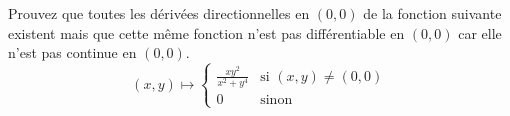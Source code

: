 
\begin{exercice}\label{exo0046}

Prouvez que toutes les dérivées directionnelles en $(0,0)$ de la fonction suivante existent mais que cette même fonction n'est pas différentiable en $(0,0)$ car elle n'est pas continue en $(0,0)$.
\begin{equation}
	(x,y)\mapsto\begin{cases}
	\frac{ xy^2 }{ x^2+y^4 }	&	\text{si }(x,y)\neq(0,0)\\
	0	&	 \text{sinon}
\end{cases}
\end{equation}

\end{exercice}
